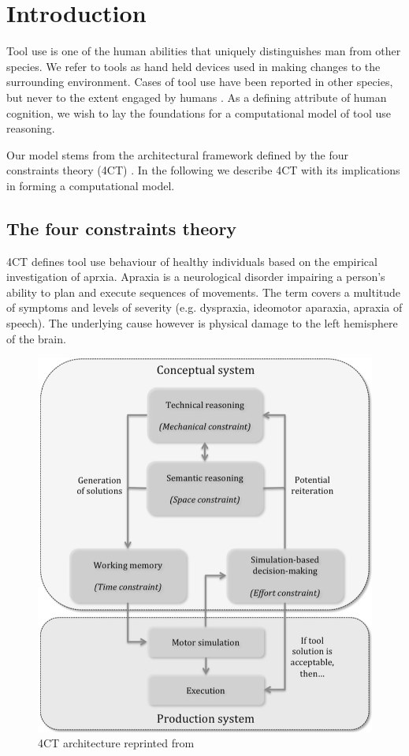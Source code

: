 \documentclass[11]{article}
\begin{document}
\section{Introduction}
Tool use is one of the human abilities that uniquely distinguishes man from other species. 
We refer to tools as hand held devices used in making changes to the surrounding environment. 
Cases of tool use have been reported in other species, but never to the extent engaged by humans \cite{boysen1999,harrington2009,lefebvre2004}. 
As a defining attribute of human cognition, we wish to lay the foundations for a computational model of tool use reasoning.

Our model stems from the architectural framework defined by the four constraints theory (4CT) \cite{osiurak2014a}.
In the following we describe 4CT with its implications in forming a computational model.  

\subsection{The four constraints theory}
4CT defines tool use behaviour of healthy individuals based on the empirical investigation of aprxia.
Apraxia is a neurological disorder impairing a person's ability to plan and execute sequences of movements.
The term covers a multitude of symptoms and levels of severity (e.g. dyspraxia, ideomotor aparaxia, apraxia of speech).
The underlying cause however is physical damage to the left hemisphere of the brain\cite{osiurak2013}.

\begin{figure}[h]
  \centering
  \includegraphics[width=.9\textwidth]{./figures/4CTArchitecture.png}
  \caption{4CT architecture reprinted from \cite{osiurak2014a}}
  \label{fig:4CTArchitecture}
\end{figure}      
\end{document}
